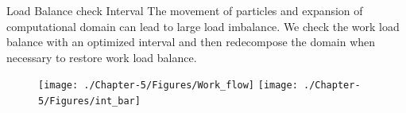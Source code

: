 \documentclass{beamer}
\begin{document}
%
%
%
%
%
%

\begin{frame}{Load Balance check Interval}
The movement of particles and expansion of computational domain can lead to large load imbalance. We check the work load balance with an optimized interval and then redecompose the domain when necessary to restore work load balance.
\begin{figure}
\flushleft
\texttt{[image: ./Chapter-5/Figures/Work\_flow]}
\hfill
\texttt{[image: ./Chapter-5/Figures/int\_bar]}
\end{figure}
\end{frame}
\end{document}
